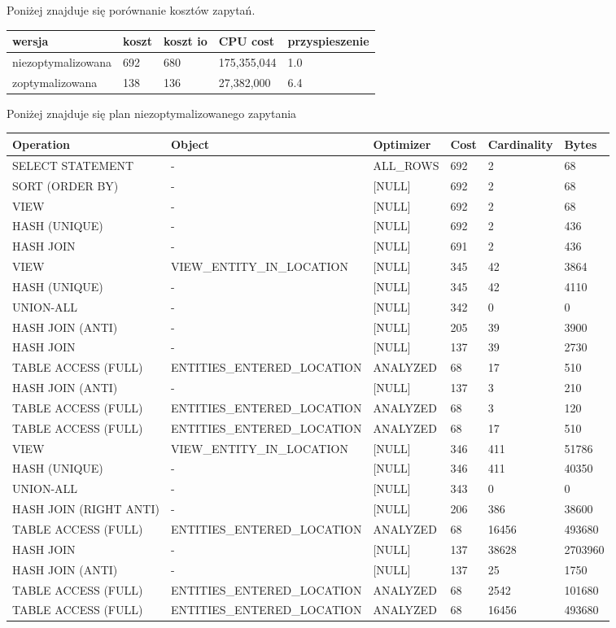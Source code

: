 \documentclass[11pt]{article}
\numberwithin{figure}{subsection}
\begin{document}
		Poniżej znajduje się porównanie kosztów zapytań.
		
		\begin{tabularx}{\textwidth}{|X|X|X|X|X|}
			\hline
			wersja & koszt & koszt io & CPU cost & przyspieszenie \\
			\hline
			niezoptymalizowana & 692 & 680 & 175,355,044 & 1.0 \\
			\hline
			zoptymalizowana & 138 & 136 & 27,382,000 & 6.4 \\
			\hline
		\end{tabularx}
		
		Poniżej znajduje się plan niezoptymalizowanego zapytania \\
		
		\begin{tabularx}{\textwidth}{|X|X|X|X|X|X|}
Operation&Object&Optimizer&Cost&Cardinality&Bytes\\ \hline
SELECT STATEMENT& - &ALL\_ROWS&692&2&68\\ \hline
SORT (ORDER BY)& - &[NULL]&692&2&68\\ \hline
VIEW& - &[NULL]&692&2&68\\ \hline
HASH (UNIQUE)& - &[NULL]&692&2&436\\ \hline
HASH JOIN& - &[NULL]&691&2&436\\ \hline
VIEW&VIEW\_ENTITY\_IN\_LOCATION&[NULL]&345&42&3864\\ \hline
HASH (UNIQUE)& - &[NULL]&345&42&4110\\ \hline
UNION-ALL& - &[NULL]&342&0&0\\ \hline
HASH JOIN (ANTI)& - &[NULL]&205&39&3900\\ \hline
HASH JOIN& - &[NULL]&137&39&2730\\ \hline
TABLE ACCESS (FULL)&ENTITIES\_ENTERED\_LOCATION&ANALYZED&68&17&510\\ \hline
HASH JOIN (ANTI)& - &[NULL]&137&3&210\\ \hline
TABLE ACCESS (FULL)&ENTITIES\_ENTERED\_LOCATION&ANALYZED&68&3&120\\ \hline
TABLE ACCESS (FULL)&ENTITIES\_ENTERED\_LOCATION&ANALYZED&68&17&510\\ \hline
VIEW&VIEW\_ENTITY\_IN\_LOCATION&[NULL]&346&411&51786\\ \hline
HASH (UNIQUE)& - &[NULL]&346&411&40350\\ \hline
UNION-ALL& - &[NULL]&343&0&0\\ \hline
HASH JOIN (RIGHT ANTI)& - &[NULL]&206&386&38600\\ \hline
TABLE ACCESS (FULL)&ENTITIES\_ENTERED\_LOCATION&ANALYZED&68&16456&493680\\ \hline
HASH JOIN& - &[NULL]&137&38628&2703960\\ \hline
HASH JOIN (ANTI)& - &[NULL]&137&25&1750\\ \hline
TABLE ACCESS (FULL)&ENTITIES\_ENTERED\_LOCATION&ANALYZED&68&2542&101680\\ \hline
TABLE ACCESS (FULL)&ENTITIES\_ENTERED\_LOCATION&ANALYZED&68&16456&493680\\ \hline
		\end{tabularx}
		
\end{document}
